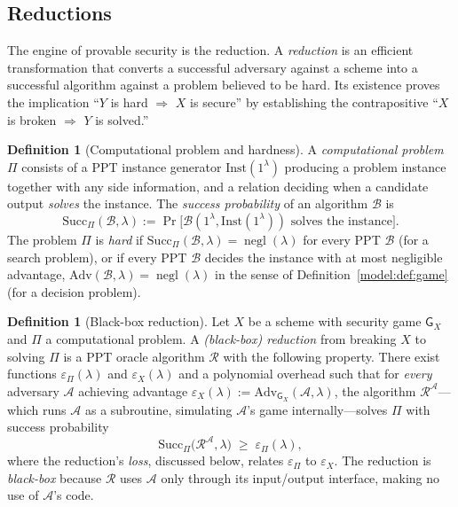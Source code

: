 \documentclass[11pt,a4paper]{article}
\theoremstyle{definition}
\newtheorem{definition}[theorem]{Definition}
\theoremstyle{remark}
\DeclareMathOperator{\negl}{negl}
\begin{document}
\subsection{Reductions}\label{model:subsec:reductions}

The engine of provable security is the reduction. A \emph{reduction} is an
efficient transformation that converts a successful adversary against a scheme
into a successful algorithm against a problem believed to be hard. Its existence
proves the implication ``\(Y\) is hard \(\Rightarrow\) \(X\) is secure'' by
establishing the contrapositive ``\(X\) is broken \(\Rightarrow\) \(Y\) is
solved.''

\begin{definition}[Computational problem and hardness]\label{model:def:problem}
A \emph{computational problem} \(\Pi\) consists of a PPT instance generator
\(\mathrm{Inst}(1^\lambda)\) producing a problem instance together with any side
information, and a relation deciding when a candidate output \emph{solves} the
instance. The \emph{success probability} of an algorithm \(\mathcal{B}\) is
\[
  \mathrm{Succ}_\Pi(\mathcal{B},\lambda)
  := \Pr\bigl[\mathcal{B}(1^\lambda, \mathrm{Inst}(1^\lambda))
     \text{ solves the instance}\bigr].
\]
The problem \(\Pi\) is \emph{hard} if \(\mathrm{Succ}_\Pi(\mathcal{B},\lambda) =
\negl(\lambda)\) for every PPT \(\mathcal{B}\) (for a search problem), or if
every PPT \(\mathcal{B}\) decides the instance with at most negligible
advantage, \(\mathrm{Adv}(\mathcal{B},\lambda) = \negl(\lambda)\) in the sense
of Definition~\ref{model:def:game} (for a decision problem).
\end{definition}

\begin{definition}[Black-box reduction]\label{model:def:reduction}
Let \(X\) be a scheme with security game \(\mathsf{G}_X\) and \(\Pi\) a
computational problem. A \emph{(black-box) reduction} from breaking \(X\) to
solving \(\Pi\) is a PPT oracle algorithm \(\mathcal{R}\) with the following
property. There exist functions \(\varepsilon_\Pi(\lambda)\) and
\(\varepsilon_X(\lambda)\) and a polynomial overhead such that for \emph{every}
adversary \(\mathcal{A}\) achieving advantage
\(\varepsilon_X(\lambda):=\mathrm{Adv}_{\mathsf{G}_X}(\mathcal{A},\lambda)\), the
algorithm \(\mathcal{R}^{\mathcal{A}}\)---which runs \(\mathcal{A}\) as a
subroutine, simulating \(\mathcal{A}\)'s game internally---solves \(\Pi\) with
success probability
\[
  \mathrm{Succ}_\Pi\bigl(\mathcal{R}^{\mathcal{A}},\lambda\bigr)
  \;\geq\; \varepsilon_\Pi(\lambda),
\]
where the reduction's \emph{loss}, discussed below, relates \(\varepsilon_\Pi\)
to \(\varepsilon_X\). The reduction is \emph{black-box} because
\(\mathcal{R}\) uses \(\mathcal{A}\) only through its input/output interface,
making no use of \(\mathcal{A}\)'s code.
\end{definition}
\end{document}
